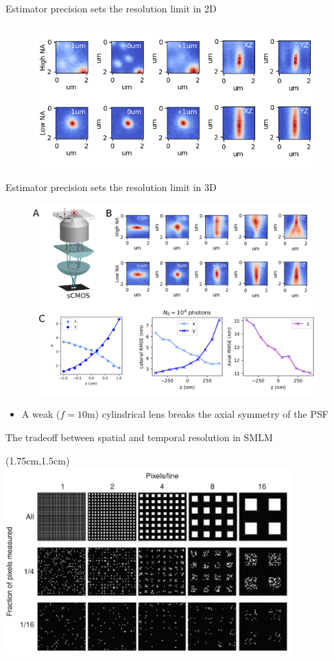\documentclass{beamer}					%
\begin{document}
\begin{frame}{Estimator precision sets the resolution limit in 2D}
\begin{figure}
\includegraphics[width=11cm]{QD-Cal2D.png}
\end{figure}
\end{frame}


\begin{frame}{Estimator precision sets the resolution limit in 3D}
\begin{figure}
\includegraphics[width=11cm]{Astigmatism.png}
\end{figure}
\begin{itemize}
\item A weak ($f=10$m) cylindrical lens breaks the axial symmetry of the PSF
\end{itemize}
\end{frame}


\begin{frame}{The tradeoff between spatial and temporal resolution in SMLM}
\begin{textblock*}{11cm}(1.75cm,1.5cm)
\includegraphics[width=11cm]{Shroff.png}
\end{textblock*}
\end{frame}
\end{document}

